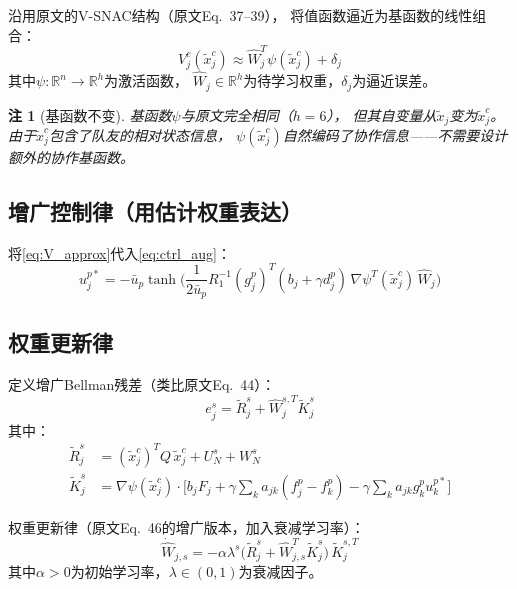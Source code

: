 \documentclass[11pt,a4paper]{article}
\newtheorem{remark}{注}
\newcommand{\R}{\mathbb{R}}
\newcommand{\ub}{\bar{u}}
\begin{document}
沿用原文的V-SNAC结构（原文Eq.~37--39），
将值函数逼近为基函数的线性组合：
\begin{equation}\label{eq:V_approx}
  V_j^c(\tilde{x}_j^c) \approx \hat{W}_j^T \psi(\tilde{x}_j^c) + \delta_j
\end{equation}
其中$\psi : \R^n \to \R^h$为激活函数，
$\hat{W}_j \in \R^h$为待学习权重，$\delta_j$为逼近误差。

\begin{remark}[基函数不变]
  基函数$\psi$与原文完全相同（$h=6$），
  但其自变量从$\tilde{x}_j$变为$\tilde{x}_j^c$。
  由于$\tilde{x}_j^c$包含了队友的相对状态信息，
  $\psi(\tilde{x}_j^c)$自然编码了协作信息——不需要设计额外的协作基函数。
\end{remark}

\subsection{增广控制律（用估计权重表达）}

将\eqref{eq:V_approx}代入\eqref{eq:ctrl_aug}：
\begin{equation}\label{eq:ctrl_nn}
  u_j^{p*} = -\ub_p \tanh\!\Big(
    \frac{1}{2\ub_p} R_1^{-1} (g_j^p)^T
    (b_j + \gamma d_j^p)\, \nabla\psi^T(\tilde{x}_j^c)\, \hat{W}_j
  \Big)
\end{equation}

\subsection{权重更新律}

定义增广Bellman残差（类比原文Eq.~44）：
\begin{equation}\label{eq:bellman_res}
  e_j^s = \tilde{R}_j^s + \hat{W}_j^{s,T} \tilde{K}_j^s
\end{equation}
其中：
\begin{align}
  \tilde{R}_j^s &= (\tilde{x}_j^c)^T Q\, \tilde{x}_j^c
    + U_N^s + W_N^s \label{eq:R_tilde} \\
  \tilde{K}_j^s &= \nabla\psi(\tilde{x}_j^c) \cdot
    \Big[b_j F_j + \gamma \textstyle\sum_k a_{jk}(f_j^p - f_k^p)
    - \gamma \textstyle\sum_k a_{jk} g_k^p u_k^{p*}\Big]
    \label{eq:K_tilde}
\end{align}

权重更新律（原文Eq.~46的增广版本，加入衰减学习率）：
\begin{equation}\label{eq:weight_update}
  \dot{\hat{W}}_{j,s} = -\alpha \lambda^s
  \big(\tilde{R}_j^s + \hat{W}_{j,s}^T \tilde{K}_j^s\big)\, \tilde{K}_j^{s,T}
\end{equation}
其中$\alpha > 0$为初始学习率，$\lambda \in (0,1)$为衰减因子。
\end{document}
